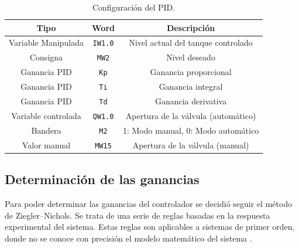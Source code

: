 \begin{table}[!t]
\renewcommand{\arraystretch}{1.3}
\centering
\begin{tabular}{c||c||c}
\hline
\bfseries Tipo & \bfseries Word  & \bfseries Descripción\\
\hline \hline
Variable Manipulada & \verb|IW1.0|  & Nivel actual del tanque controlado\\
Consigna & \verb|MW2|  & Nivel deseado\\
Ganancia PID & \verb|Kp|  & Ganancia proporcional\\
Ganancia PID & \verb|Ti|  & Ganancia integral\\
Ganancia PID & \verb|Td|  & Ganancia derivativa\\
Variable controlada & \verb|QW1.0|  &  Apertura de la válvula (automático)\\
Bandera & \verb|M2|  & 1: Modo manual, 0: Modo automático \\
Valor manual & \verb|MW15|  & Apertura de la válvula (manual)\\
\hline
\end{tabular}
\caption{Configuración del PID.}
\label{table:controladorpid}
\end{table}

\subsection{Determinación de las ganancias}
\label{subsec:ZiegerNichols}
Para poder determinar las ganancias del controlador se decidió seguir el método
de Ziegler–Nichols.
Se trata de una serie de reglas basadas en la respuesta experimental
del sistema.
Estas reglas son aplicables a sistemas de primer orden, donde no se conoce con
precisión el modelo matemático del sistema \cite{bib:Ogata}.

